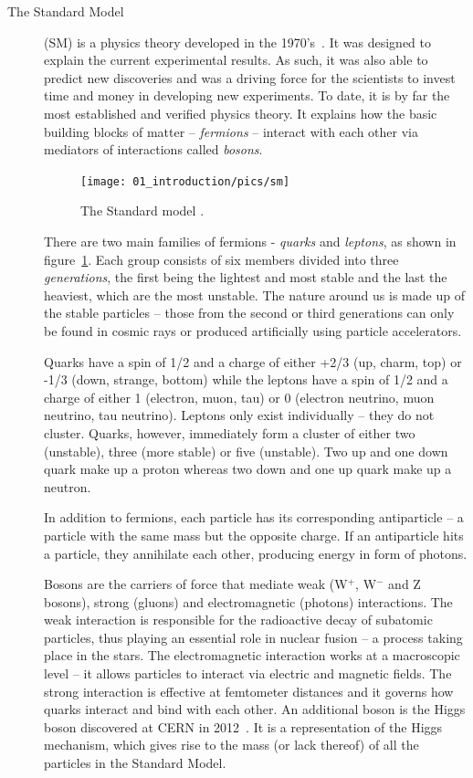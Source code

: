 \begin{description}
\item[The Standard Model]
(SM) is a physics theory developed in the 1970's~\cite{Novaes:1999yn}. It was designed to explain the current experimental results. As such, it was also able to predict new discoveries and was a driving force for the scientists to invest time and money in developing new experiments. To date, it is by far the most established and verified physics theory. It explains how the basic building blocks of matter -- \emph{fermions} -- interact with each other via mediators of interactions called \emph{bosons}.  
\begin{figure}[!t]
\centering
\texttt{[image: 01\_introduction/pics/sm]}
\caption{The Standard model \cite{Dominguez:2002395}.}
\label{fig:sm1}
\end{figure}
There are two main families of fermions - \emph{quarks} and \emph{leptons}, as shown in figure~\ref{fig:sm1}. Each group consists of six members divided into three \emph{generations}, the first being the lightest and most stable and the last the heaviest, which are the most unstable. The nature around us is made up of the stable particles -- those from the second or third generations can only be found in cosmic rays or produced artificially using particle accelerators.

Quarks have a spin of 1/2 and a charge of either +2/3 (up, charm, top)  or -1/3  (down, strange, bottom) while the leptons have a spin of 1/2  and a charge of either 1 (electron, muon, tau) or 0 (electron neutrino, muon neutrino, tau neutrino). Leptons only exist individually -- they do not cluster. Quarks, however, immediately form a cluster of either two (unstable), three (more stable) or five (unstable). Two up and one down quark make up a proton whereas two down and one up quark make up a neutron.

In addition to fermions, each particle has its corresponding antiparticle -- a particle with the same mass but the opposite charge. If an antiparticle hits a particle, they annihilate each other, producing energy in form of photons. 

Bosons are the carriers of force that mediate weak (W$^+$, W$^-$ and Z bosons), strong (gluons) and electromagnetic (photons) interactions. The weak interaction is responsible for the radioactive decay of subatomic particles, thus playing an essential role in nuclear fusion -- a process taking place in the stars. The electromagnetic interaction works at a macroscopic level -- it allows particles to interact via electric and magnetic fields. The strong interaction is effective at femtometer distances and it governs how quarks interact and bind with each other. An additional boson is the Higgs boson discovered at CERN in 2012~\cite{Rossi:2026222}. It is a representation of the Higgs mechanism, which gives rise to the mass (or lack thereof) of all the particles in the Standard Model.
\end{description}

